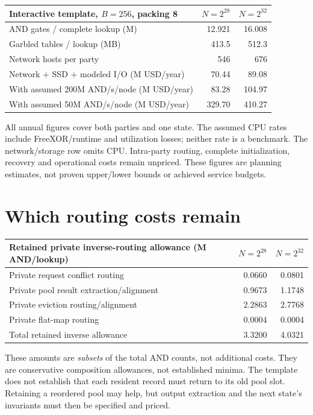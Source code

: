 \begin{center}\small
\begin{tabularx}{\linewidth}{Xrr}\toprule
Interactive template, $B=256$, packing 8 & $N=2^{28}$ & $N=2^{32}$\\\midrule
AND gates / complete lookup (M) & 12.921 & 16.008 \\
Garbled tables / lookup (MB) & 413.5 & 512.3 \\
Network hosts per party & 546 & 676 \\
Network + SSD + modeled I/O (M USD/year) & 70.44 & 89.08 \\
With assumed 200M AND/s/node (M USD/year) & 83.28 & 104.97 \\
With assumed 50M AND/s/node (M USD/year) & 329.70 & 410.27 \\
\bottomrule\end{tabularx}\end{center}
All annual figures cover both parties and one state. The assumed CPU rates
include FreeXOR/runtime and utilization losses; neither rate is a benchmark.
The network/storage row omits CPU. Intra-party routing, complete initialization,
recovery and operational costs remain unpriced. These figures are planning
estimates, not proven upper/lower bounds or achieved service budgets.

\clearpage
\section{Which routing costs remain}
\begin{center}\small
\begin{tabularx}{\linewidth}{Xrr}\toprule
Retained private inverse-routing allowance (M AND/lookup) & $N=2^{28}$ & $N=2^{32}$\\\midrule
Private request conflict routing & 0.0660 & 0.0801 \\
Private pool result extraction/alignment & 0.9673 & 1.1748 \\
Private eviction routing/alignment & 2.2863 & 2.7768 \\
Private flat-map routing & 0.0004 & 0.0004 \\
Total retained inverse allowance & 3.3200 & 4.0321 \\
\bottomrule\end{tabularx}\end{center}
These amounts are \emph{subsets} of the total AND counts, not additional costs.
They are conservative composition allowances, not established minima. The
template does not establish that each resident record must return to its old
pool slot. Retaining a reordered pool may help, but output extraction and the
next state's invariants must then be specified and priced.

